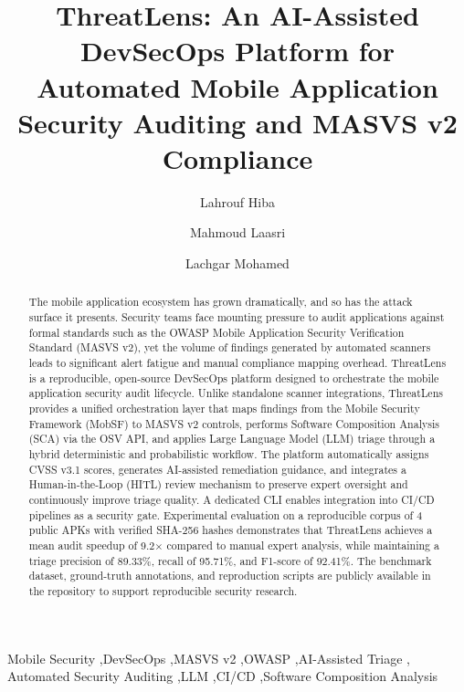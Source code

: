 \documentclass[preprint,12pt,a4paper]{elsarticle}
\begin{document}
\renewcommand{\labelenumii}{\arabic{enumi}.\arabic{enumii}}

\begin{frontmatter}

\title{ThreatLens: An AI-Assisted DevSecOps Platform for Automated Mobile
Application Security Auditing and MASVS v2 Compliance}
\author[1]{Lahrouf Hiba}
\author[1]{Mahmoud Laasri}

\author[1]{Lachgar Mohamed}

\address[1]{École Marocaine des Sciences de l'Ingénieur (EMSI),
Department of Computer Science, Specialized in Cybersecurity ,
Marrakech, Morocco}

\begin{abstract}
The mobile application ecosystem has grown dramatically, and so has the attack surface it
presents. Security teams face mounting pressure to audit applications against formal standards
such as the OWASP Mobile Application Security Verification Standard (MASVS v2), yet the
volume of findings generated by automated scanners leads to significant alert fatigue and
manual compliance mapping overhead. ThreatLens is a reproducible, open-source DevSecOps
platform designed to orchestrate the mobile application security audit lifecycle. Unlike
standalone scanner integrations, ThreatLens provides a unified orchestration layer that maps
findings from the Mobile Security Framework (MobSF) to MASVS v2 controls, performs
Software Composition Analysis (SCA) via the OSV API, and applies Large Language Model (LLM)
triage through a hybrid deterministic and probabilistic workflow. The platform automatically
assigns CVSS v3.1 scores, generates AI-assisted remediation guidance, and integrates a
Human-in-the-Loop (HITL) review mechanism to preserve expert oversight and continuously
improve triage quality. A dedicated CLI enables integration into CI/CD pipelines as a
security gate. Experimental evaluation on a reproducible corpus of 4 public APKs with
verified SHA-256 hashes demonstrates that ThreatLens achieves a mean audit speedup of
9.2$\times$ compared to manual expert analysis, while maintaining a triage precision of
89.33\%, recall of 95.71\%, and F1-score of 92.41\%. The benchmark dataset, ground-truth
annotations, and reproduction scripts are publicly available in the repository to support
reproducible security research.
\end{abstract}

\begin{keyword}
Mobile Security \sep DevSecOps \sep MASVS v2 \sep OWASP \sep AI-Assisted Triage \sep
Automated Security Auditing \sep LLM \sep CI/CD \sep Software Composition Analysis
\end{keyword}

\end{frontmatter}
\end{document}
